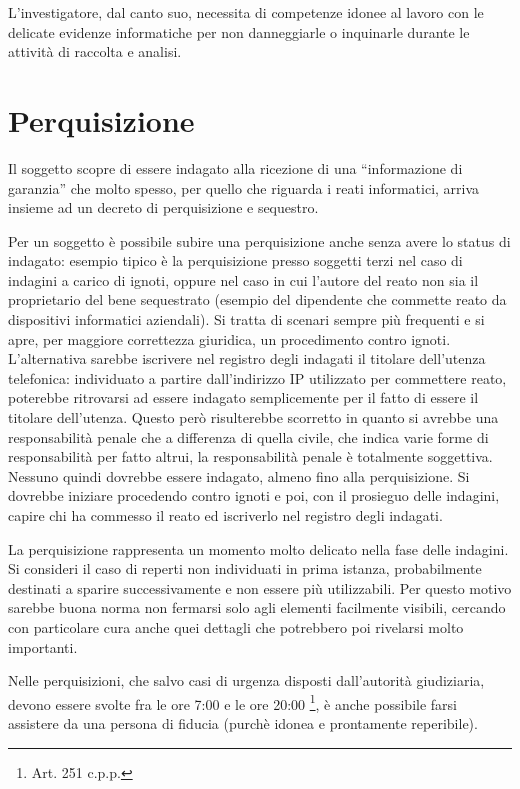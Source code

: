 L'investigatore, dal canto suo, necessita di competenze idonee al lavoro con le delicate evidenze informatiche per non danneggiarle o inquinarle durante le attività di raccolta e analisi. 

\section{Perquisizione}

Il soggetto scopre di essere indagato alla ricezione di una ``informazione di garanzia'' che molto spesso, per quello che riguarda i reati informatici, arriva insieme ad un decreto di perquisizione e sequestro.

Per un soggetto è possibile subire una perquisizione anche senza avere lo status di indagato: esempio tipico è la perquisizione presso soggetti terzi nel caso di indagini a carico di ignoti, oppure nel caso in cui l'autore del reato non sia il proprietario del bene sequestrato (esempio del dipendente che commette reato da dispositivi informatici aziendali). Si tratta di scenari sempre più frequenti e si apre, per maggiore correttezza giuridica, un procedimento contro ignoti. L'alternativa sarebbe iscrivere nel registro degli indagati il titolare dell'utenza telefonica: individuato a partire dall'indirizzo IP utilizzato per commettere reato, poterebbe ritrovarsi ad essere indagato semplicemente per il fatto di essere il titolare dell'utenza. Questo però risulterebbe scorretto in quanto si avrebbe una responsabilità penale che a differenza di quella civile, che indica varie forme di responsabilità per fatto altrui, la responsabilità penale è totalmente soggettiva. Nessuno quindi dovrebbe essere indagato, almeno fino alla perquisizione. Si dovrebbe iniziare procedendo contro ignoti e poi, con il prosieguo delle indagini, capire chi ha commesso il reato ed iscriverlo nel registro degli indagati.  

La perquisizione rappresenta un momento molto delicato nella fase delle indagini. Si consideri il caso di reperti non individuati in prima istanza, probabilmente destinati a sparire successivamente e non essere più utilizzabili. Per questo motivo sarebbe buona norma non fermarsi solo agli elementi facilmente visibili, cercando con particolare cura anche quei dettagli che potrebbero poi rivelarsi molto importanti.

Nelle perquisizioni, che salvo casi di urgenza disposti dall'autorità giudiziaria, devono essere svolte fra le ore 7:00 e le ore 20:00 \footnote{Art. 251 c.p.p.}, è anche possibile farsi assistere da una persona di fiducia (purchè idonea e prontamente reperibile).

